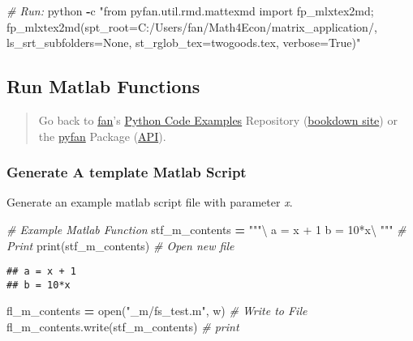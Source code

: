 \documentclass[
]{book}
\newenvironment{Shaded}{\begin{snugshade}}{\end{snugshade}}
\newcommand{\BuiltInTok}[1]{#1}
\newcommand{\CommentTok}[1]{\textcolor[rgb]{0.56,0.35,0.01}{\textit{#1}}}
\newcommand{\NormalTok}[1]{#1}
\newcommand{\OperatorTok}[1]{\textcolor[rgb]{0.81,0.36,0.00}{\textbf{#1}}}
\newcommand{\StringTok}[1]{\textcolor[rgb]{0.31,0.60,0.02}{#1}}
\begin{document}
\begin{Shaded}
\begin{Highlighting}[]
\CommentTok{\# Run:}
\NormalTok{python }\OperatorTok{{-}}\NormalTok{c }\StringTok{"from pyfan.util.rmd.mattexmd import fp\_mlxtex2md; fp\_mlxtex2md(spt\_root=\textquotesingle{}C:/Users/fan/Math4Econ/matrix\_application/\textquotesingle{}, ls\_srt\_subfolders=None, st\_rglob\_tex=\textquotesingle{}twogoods.tex\textquotesingle{}, verbose=True)"}
\end{Highlighting}
\end{Shaded}

\hypertarget{run-matlab-functions}{%
\subsection{Run Matlab Functions}\label{run-matlab-functions}}

\begin{quote}
Go back to \href{http://fanwangecon.github.io/}{fan}'s \href{https://fanwangecon.github.io/Py4Econ/}{Python Code Examples} Repository (\href{https://fanwangecon.github.io/Py4Econ/bookdown}{bookdown site}) or the \href{https://pyfan.readthedocs.io/en/latest/}{pyfan} Package (\href{https://pyfan.readthedocs.io/en/latest/reference.html}{API}).
\end{quote}

\hypertarget{generate-a-template-matlab-script}{%
\subsubsection{Generate A template Matlab Script}\label{generate-a-template-matlab-script}}

Generate an example matlab script file with parameter \emph{x}.

\begin{Shaded}
\begin{Highlighting}[]
\CommentTok{\# Example Matlab Function}
\NormalTok{stf\_m\_contents }\OperatorTok{=} \StringTok{"""\textbackslash{}}
\StringTok{a = x + 1}
\StringTok{b = 10*x\textbackslash{}}
\StringTok{"""}
\CommentTok{\# Print}
\BuiltInTok{print}\NormalTok{(stf\_m\_contents)}
\CommentTok{\# Open new file}
\end{Highlighting}
\end{Shaded}

\begin{verbatim}
## a = x + 1
## b = 10*x
\end{verbatim}

\begin{Shaded}
\begin{Highlighting}[]
\NormalTok{fl\_m\_contents }\OperatorTok{=} \BuiltInTok{open}\NormalTok{(}\StringTok{"\_m/fs\_test.m"}\NormalTok{, }\StringTok{\textquotesingle{}w\textquotesingle{}}\NormalTok{)}
\CommentTok{\# Write to File}
\NormalTok{fl\_m\_contents.write(stf\_m\_contents)}
\CommentTok{\# print}
\end{Highlighting}
\end{Shaded}
\end{document}
